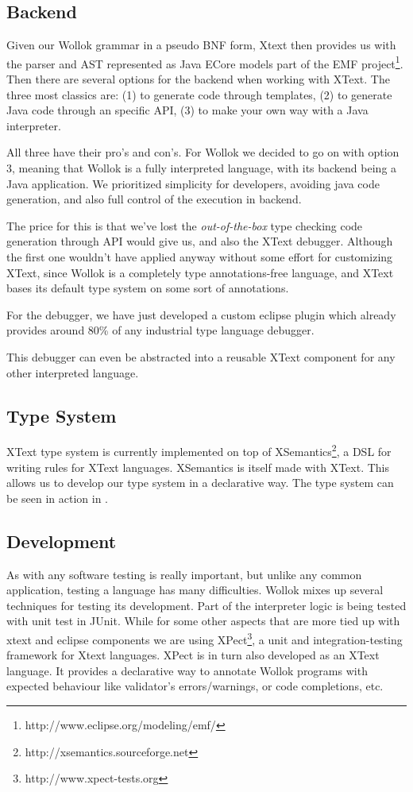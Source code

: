 \subsection{Backend}
Given our Wollok grammar in a pseudo BNF form, Xtext then provides us with the parser and AST represented as Java ECore models part of the EMF project\footnote{http://www.eclipse.org/modeling/emf/}. 
Then there are several options for the backend when working with XText. The three most classics are: (1) to generate code through templates, (2) to generate Java code through an specific API, (3) to make your own way with a Java interpreter.

All three have their pro’s and con’s. For Wollok we decided to go on with option 3, meaning that Wollok is a fully interpreted language, with its backend being a Java application.
We prioritized simplicity for developers, \eg avoiding java code generation, and also full control of the execution in backend. 

The price for this is that we’ve lost the \emph{out-of-the-box} type checking code generation through API would give us, and also the XText debugger.
Although the first one wouldn’t have applied anyway without some effort for
customizing XText, since Wollok is a completely type annotations-free language,
and XText bases its default type system on some sort of annotations.

For the debugger, we have just developed a custom eclipse plugin which already
provides around 80\% of any industrial type language debugger.

This debugger can even be abstracted into a reusable XText component for any other interpreted language.

\subsection{Type System}
XText type system is currently implemented on top of XSemantics\footnote{http://xsemantics.sourceforge.net}, a DSL for writing rules for XText languages. XSemantics is itself made with XText.
This allows us to develop our type system in a declarative way. The type system can be seen in action in .

\subsection{Development}
As with any software testing is really important, but unlike any common application, testing a language has many difficulties.
Wollok mixes up several techniques for testing its development.
Part of the interpreter logic is being tested with unit test in JUnit. While for some other aspects that are more tied up with xtext and eclipse components we are using XPect\footnote{http://www.xpect-tests.org}, a unit and integration-testing framework for Xtext languages.
XPect is in turn also developed as an XText language.
It provides a declarative way to annotate Wollok programs with expected
behaviour like validator’s errors/warnings, or code completions,  etc.

